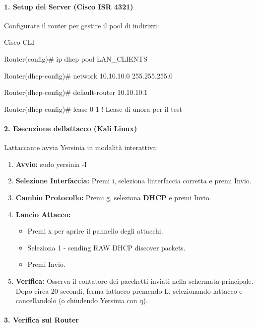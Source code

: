 \documentclass[11pt,a4paper]{article}
\begin{document}
\paragraph{1. Setup del Server (Cisco ISR
4321)}\label{setup-del-server-cisco-isr-4321}

Configurate il router per gestire il pool di indirizzi:

Cisco CLI

Router(config)\# ip dhcp pool LAN\_CLIENTS

Router(dhcp-config)\# network 10.10.10.0 255.255.255.0

Router(dhcp-config)\# default-router 10.10.10.1

Router(dhcp-config)\# lease 0 1 ! Lease di un\textquotesingle ora per il
test

\paragraph{2. Esecuzione dell\textquotesingle attacco (Kali
Linux)}\label{esecuzione-dellattacco-kali-linux}

L\textquotesingle attaccante avvia Yersinia in modalità interattiva:

\begin{enumerate}
\def\labelenumi{\arabic{enumi}.}
\item
  \textbf{Avvio:} sudo yersinia -I
\item
  \textbf{Selezione Interfaccia:} Premi i, seleziona
  l\textquotesingle interfaccia corretta e premi Invio.
\item
  \textbf{Cambio Protocollo:} Premi g, seleziona \textbf{DHCP} e premi
  Invio.
\item
  \textbf{Lancio Attacco:}

  \begin{itemize}
  \item
    Premi x per aprire il pannello degli attacchi.
  \item
    Seleziona 1 - sending RAW DHCP discover packets.
  \item
    Premi Invio.
  \end{itemize}
\item
  \textbf{Verifica:} Osserva il contatore dei pacchetti inviati nella
  schermata principale. Dopo circa 20 secondi, ferma
  l\textquotesingle attacco premendo L, selezionando
  l\textquotesingle attacco e cancellandolo (o chiudendo Yersinia con
  q).
\end{enumerate}

\paragraph{3. Verifica sul Router}\label{verifica-sul-router}
\end{document}
